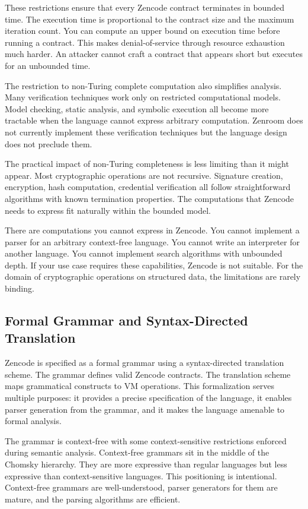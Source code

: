 These restrictions ensure that every Zencode contract terminates in
bounded time. The execution time is proportional to the contract size
and the maximum iteration count. You can compute an upper bound on
execution time before running a contract. This makes denial-of-service
through resource exhaustion much harder. An attacker cannot craft a
contract that appears short but executes for an unbounded time.

The restriction to non-Turing complete computation also simplifies
analysis. Many verification techniques work only on restricted
computational models. Model checking, static analysis, and symbolic
execution all become more tractable when the language cannot express
arbitrary computation. Zenroom does not currently implement these
verification techniques but the language design does not preclude
them.

The practical impact of non-Turing completeness is less limiting than
it might appear. Most cryptographic operations are not
recursive. Signature creation, encryption, hash computation,
credential verification all follow straightforward algorithms with
known termination properties. The computations that Zencode needs to
express fit naturally within the bounded model.

There are computations you cannot express in Zencode. You cannot
implement a parser for an arbitrary context-free language. You cannot
write an interpreter for another language. You cannot implement search
algorithms with unbounded depth. If your use case requires these
capabilities, Zencode is not suitable. For the domain of cryptographic
operations on structured data, the limitations are rarely binding.

\subsection{Formal Grammar and Syntax-Directed Translation}

Zencode is specified as a formal grammar using a syntax-directed
translation scheme. The grammar defines valid Zencode contracts. The
translation scheme maps grammatical constructs to VM operations. This
formalization serves multiple purposes: it provides a precise
specification of the language, it enables parser generation from the
grammar, and it makes the language amenable to formal analysis.

The grammar is context-free with some context-sensitive restrictions
enforced during semantic analysis. Context-free grammars sit in the
middle of the Chomsky hierarchy. They are more expressive than regular
languages but less expressive than context-sensitive languages. This
positioning is intentional. Context-free grammars are well-understood,
parser generators for them are mature, and the parsing algorithms are
efficient.

